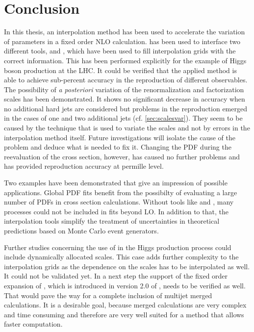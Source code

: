 
\chapter{Conclusion}
In this thesis, an interpolation method has been used to accelerate the variation of parameters in a fixed order NLO calculation.
\mcgrid{} has been used to interface two different tools, \appl{} and \fnlo{}, which have been used to fill interpolation grids with the correct information.
This has been performed explicitly for the example of Higgs boson production at the LHC.
It could be verified that the applied method is able to achieve sub-percent accuracy in the reproduction of different observables.
The possibility of \textit{a posteriori} variation of the renormalization and factorization scales has been demonstrated.
It shows no significant decrease in accuracy when no additional hard jets are considered but problems in the reproduction emerged in the cases of one and two additional jets (cf. \cref{sec:scalesvar}).
They seem to be caused by the technique that is used to variate the scales and not by errors in the interpolation method itself.
Future investigations will isolate the cause of the problem and deduce what is needed to fix it.
Changing the PDF during the reevaluation of the cross section, however, has caused no further problems and has provided reproduction accuracy at permille level.

Two examples have been demonstrated that give an impression of possible applications.
Global PDF fits benefit from the possibilty of evaluating a large number of PDFs in cross section calculations.
Without tools like \appl{} and \fnlo{}, many processes could not be included in fits beyond LO.
In addition to that, the interpolation tools simplify the treatment of uncertainties in theoretical predictions based on Monte Carlo event generators.

Further studies concerning the use of \mcgrid{} in the Higgs production process could include dynamically allocated scales.
This case adds further complexity to the interpolation grids as the dependence on the scales has to be interpolated as well.
It could not be validated yet.
In a next step the support of the fixed order expansion of \mcatnlo{}, which is introduced in version 2.0 of \mcgrid{}, needs to be verified as well.
That would pave the way for a complete inclusion of multijet merged calculations.
It is a desirable goal, because merged calculations are very complex and time consuming and therefore are very well suited for a method that allows faster computation.
%

